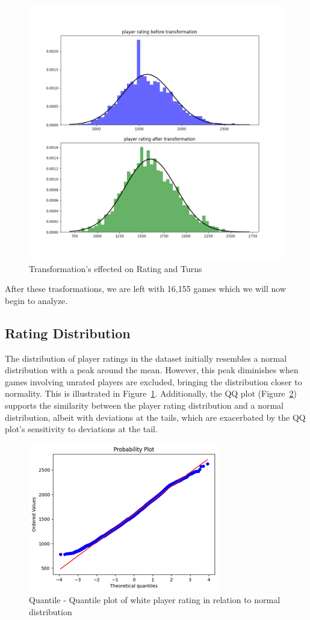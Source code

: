 \documentclass[conference]{IEEEtran}
\begin{document}
\begin{figure}[H]
    \centering
    \includegraphics[width=0.8\linewidth]{transformation_plot.png}
    \caption{Transformation's effected on Rating and Turns}
    \label{fig:transformation_plot}
\end{figure}


After these trasformations, we are left with 16,155 games which we will now begin to analyze.

\subsection{Rating Distribution}
The distribution of player ratings in the dataset initially resembles a normal distribution with a peak around the mean. However, this peak diminishes when games involving unrated players are excluded, bringing the distribution closer to normality. This is illustrated in Figure~\ref{fig:transformation_plot}. Additionally, the QQ plot (Figure~\ref{fig:rating_qq}) supports the similarity between the player rating distribution and a normal distribution, albeit with deviations at the tails, which are exacerbated by the QQ plot's sensitivity to deviations at the tail.

\begin{figure}[H]
    \centering
    \includegraphics[width=0.8\linewidth]{ratingqq.png}
    \caption{Quantile - Quantile plot of white player rating in relation to normal distribution}
    \label{fig:rating_qq}
\end{figure}
\end{document}

